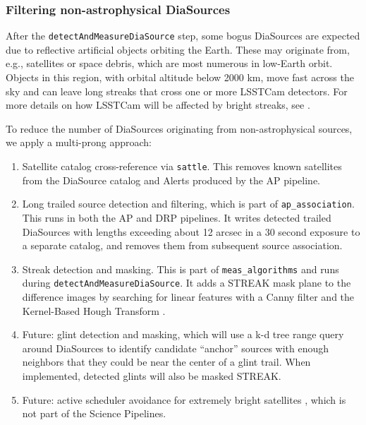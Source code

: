 \subsubsection{Filtering non-astrophysical DiaSources}
\label{sec:streaks}

After the \texttt{detectAndMeasureDiaSource} step, some bogus DiaSources are expected due to reflective artificial objects orbiting the Earth.
These may originate from, e.g., satellites or space debris, which are most numerous in low-Earth orbit.
Objects in this region, with orbital altitude below 2000 km, move fast across the sky and can leave long streaks that cross one or more LSSTCam detectors.
For more details on how LSSTCam will be affected by bright streaks, see \citet{2020AJ....160..226T,2022A&C....3900584H,2024SPIE13103E..1ZP,2024SPIE13103E..21S,2025arXiv250205418P}.

To reduce the number of DiaSources originating from non-astrophysical sources, we apply a multi-prong approach:

\begin{enumerate}
\item Satellite catalog cross-reference via \texttt{sattle}.
This removes known satellites from the DiaSource catalog and Alerts produced by the AP pipeline.

\item Long trailed source detection and filtering, which is part of \texttt{ap\_association}.
This runs in both the AP and DRP pipelines. It writes detected trailed DiaSources with lengths exceeding about 12 arcsec in a 30 second exposure to a separate catalog, and removes them from subsequent source association.

\item Streak detection and masking.
This is part of \texttt{meas\_algorithms} and runs during \texttt{detectAndMeasureDiaSource}.
It adds a STREAK mask plane to the difference images by searching for linear features with a Canny filter and the Kernel-Based Hough Transform \citep{2008PatRe..41..299F}.

\item Future: glint detection and masking, which will use a k-d tree range query around DiaSources to identify candidate ``anchor'' sources with enough neighbors that they could be near the center of a glint trail.
When implemented, detected glints will also be masked STREAK.

\item Future: active scheduler avoidance for extremely bright satellites \citep{2022ApJ...941L..15H}, which is not part of the Science Pipelines.
\end{enumerate}

